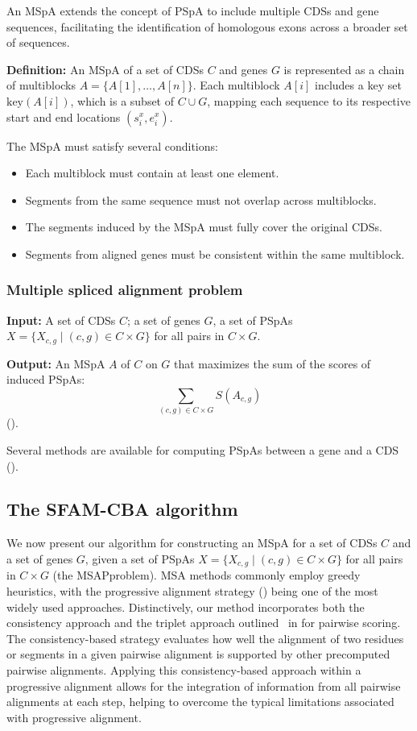 \documentclass[12pt,oneside,letterpaper,english]{article}
\begin{document}
An MSpA extends the concept of PSpA to include multiple CDSs and gene sequences, facilitating the identification of homologous exons across a broader set of sequences. 

\textbf{Definition:} An MSpA of a set of CDSs \( C \) and genes \( G \) is represented as a chain of multiblocks \( A = \{A[1], \ldots, A[n]\} \). Each multiblock \( A[i] \) includes a key set \( \text{key}(A[i]) \), which is a subset of \( C \cup G \), mapping each sequence to its respective start and end locations \( (s^x_i, e^x_i) \).

The MSpA must satisfy several conditions:
\begin{itemize}
    \item Each multiblock must contain at least one element.
    \item Segments from the same sequence must not overlap across multiblocks.
    \item The segments induced by the MSpA must fully cover the original CDSs.
    \item Segments from aligned genes must be consistent within the same multiblock.
\end{itemize}

\subsubsection{Multiple spliced alignment problem }
\textbf{Input:} A set of CDSs \( C \); a set of genes \( G \), a set of PSpAs \( X = \{ X_{c,g} \mid (c, g) \in C \times G \} \) for all pairs in \( C \times G \).

\textbf{Output:} An MSpA \( A \) of \( C \) on \( G \) that maximizes the sum of the scores of induced PSpAs: \[
\sum_{(c,g) \in C \times G} S(A_{c,g})\] (\textit{\cite{jammali2022pairwise}}).

Several methods are available for computing PSpAs between a gene and a CDS (\textit{\cite{jammali2019splicedfamalign}}).

\subsection{The SFAM-CBA algorithm}
We now present our algorithm for constructing an MSpA for a set of CDSs \( C \) and a set of genes \( G \),
given a set of PSpAs \( X = \{ X_{c,g} \mid (c, g) \in C \times G \} \) for all pairs in \( C \times G \) 
(the MSAPproblem). MSA methods commonly employ greedy heuristics, with the progressive alignment 
strategy (\textit{\cite{feng1987progressive}}) being one of the most widely used approaches.
Distinctively, our method incorporates both the consistency approach and the triplet approach outlined \
in \textit{\cite{t_coffee_alignment}} for pairwise scoring. The consistency-based strategy evaluates how well the alignment of two 
residues or segments in a given pairwise alignment is supported by other precomputed pairwise alignments. Applying this consistency-based 
approach within a progressive alignment allows for the integration of information from all pairwise alignments at each step, 
helping to overcome the typical limitations associated with progressive alignment.
\end{document}

